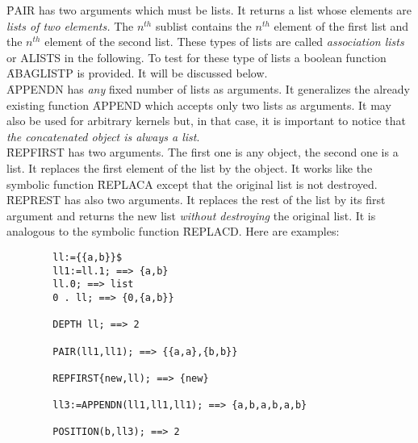 \begin{itemize}
\f{PAIR} has two arguments which must be lists. It returns a list
whose elements are {\em lists of two elements.}
The $n^{th}$ sublist contains the $n^{th}$ element of the first list
and the $n^{th}$ element of the second list. These types of lists are called
{\em association lists} or ALISTS in the following.
To test for these type of lists a boolean function \f{ABAGLISTP}
is provided. It will be discussed below.\\
\f{APPENDN} has {\em any} fixed number of lists as arguments. It
generalizes the already existing function \f{APPEND} which accepts
only two lists as arguments. It may also be used for arbitrary kernels 
but, in that case, it is important to notice that {\em the concatenated 
object is always a list}.\\
\f{REPFIRST} has two arguments. The first one is any object, the second one
is a list. It replaces the first element of the list by the object. It
works like the symbolic function \f{REPLACA} except that the
original list is not destroyed.\\
\f{REPREST} has also two arguments. It replaces the rest of the list by
its first argument and returns the new list {\em without destroying} the
original list. It is analogous to the symbolic function \f{REPLACD}.
Here are examples:
\begin{verbatim}
        ll:={{a,b}}$
        ll1:=ll.1; ==> {a,b}
        ll.0; ==> list
        0 . ll; ==> {0,{a,b}}

        DEPTH ll; ==> 2

        PAIR(ll1,ll1); ==> {{a,a},{b,b}}

        REPFIRST{new,ll); ==> {new}

        ll3:=APPENDN(ll1,ll1,ll1); ==> {a,b,a,b,a,b}

        POSITION(b,ll3); ==> 2


\end{verbatim}
\end{itemize}
